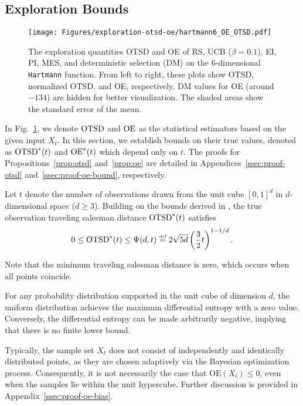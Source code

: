 \documentclass[accepted]{uai2025}
\begin{document}
\subsection{Exploration Bounds}
\begin{figure}[tb]
    \centering
    \texttt{[image: Figures/exploration-otsd-oe/hartmann6\_OE\_OTSD.pdf]}
    \caption{The exploration quantities \ac{OTSD} and \ac{OE} of RS, UCB ($\beta=0.1$), EI, PI, MES, and deterministic selection (DM) on the 6-dimensional \texttt{Hartmann} function. From left to right, these plots show \ac{OTSD}, normalized \ac{OTSD}, and \ac{OE}, respectively. DM values for OE (around $-134$) are hidden for better visualization. The shaded areas show the standard error of the mean.}
    \label{fig:exploration-hartmann}
\end{figure}
In Fig.~\ref{fig:exploration-hartmann}, we denote $\textup{OTSD}$ and $\textup{OE}$ as the statistical estimators based on the given input $X_t$. 
In this section, we establish bounds on their true values, denoted as $\textup{OTSD}^\ast(t)$ and $\textup{OE}^\ast(t)$ which depend only on $t$. 
The proofs for Propositions~\ref{prop:otsd} and~\ref{prop:oe} are detailed in Appendices~\ref{ssec:proof-otsd} and~\ref{ssec:proof-oe-bound}, respectively. 

\begin{proposition}
\label{prop:otsd}
Let $t$ denote the number of observations drawn from the unit cube $[0,1]^d$ in $d$-dimensional space ($d\geq 3$). Building on the bounds derived in \citep{bollobas1992travelling, balogh2024traveling}, the true observation traveling salesman distance $\textup{OTSD}^\ast(t)$ satisfies
\newcommand{\defeq}{\stackrel{\text{\tiny def}}{=}} 
\begin{equation}
    0 \leq \OTSD^\ast(t) \leq \Psi(d,t) \defeq 2\sqrt{5d}\left(\frac{3}{2}t\right)^{1 - 1/d}.
    \label{eq:bound_otsd}
\end{equation}
\end{proposition}
Note that the minimum traveling salesman distance is zero, which occurs when all points coincide.

\begin{proposition}
\label{prop:oe}
For any probability distribution supported in the unit cube of dimension $d$, the uniform distribution achieves the maximum differential entropy with a zero value. 
Conversely, the differential entropy can be made arbitrarily negative, implying that there is no finite lower bound.
\end{proposition}
Typically, the sample set $X_t$ does not consist of independently and identically distributed points, as they are chosen adaptively via the Bayesian optimization process. Consequently, it is not necessarily the case that $\text{OE}(X_t) \le 0$, even when the samples lie within the unit hypercube. Further discussion is provided in Appendix~\ref{ssec:proof-oe-bias}.
\end{document}
